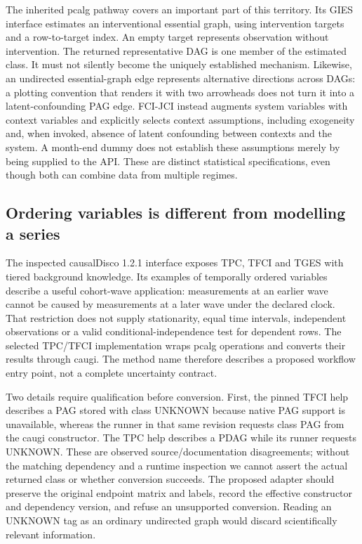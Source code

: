 The inherited pcalg pathway covers an important part of this territory. Its
GIES interface estimates an interventional essential graph, using intervention
targets and a row-to-target index. An empty target represents observation without
intervention. The returned representative DAG is one member of the estimated
class. It must not silently become the uniquely established mechanism. Likewise,
an undirected essential-graph edge represents alternative directions across
DAGs: a plotting convention that renders it with two arrowheads does not turn
it into a latent-confounding PAG edge. FCI-JCI instead augments system variables
with context variables and explicitly selects context assumptions, including
exogeneity and, when invoked, absence of latent confounding between contexts and
the system. A month-end dummy does not establish these assumptions merely by
being supplied to the API. These are distinct statistical specifications, even
though both can combine data from multiple regimes. \citep{exec13_pcalg,exec13_latentr_primary}

\subsection{Ordering variables is different from modelling a series}

The inspected causalDisco 1.2.1 interface exposes TPC, TFCI and TGES with tiered
background knowledge. Its examples of temporally ordered variables describe a
useful cohort-wave application: measurements at an earlier wave cannot be caused
by measurements at a later wave under the declared clock. That restriction does
not supply stationarity, equal time intervals, independent observations or a
valid conditional-independence test for dependent rows. The selected TPC/TFCI
implementation wraps pcalg operations and converts their results through caugi.
The method name therefore describes a proposed workflow entry point, not a
complete uncertainty contract. \citep{exec14_rtime_causaldisco}

Two details require qualification before conversion. First, the pinned TFCI
help describes a PAG stored with class UNKNOWN because native PAG support is
unavailable, whereas the runner in that same revision requests class PAG from
the caugi constructor. The TPC help describes a PDAG while its runner requests
UNKNOWN. These are observed source/documentation disagreements; without the
matching dependency and a runtime inspection we cannot assert the actual returned
class or whether conversion succeeds. The proposed adapter should preserve the
original endpoint matrix and labels, record the effective constructor and
dependency version, and refuse an unsupported conversion. Reading an UNKNOWN
tag as an ordinary undirected graph would discard scientifically relevant
information. \citep{exec14_rtime_causaldisco}

